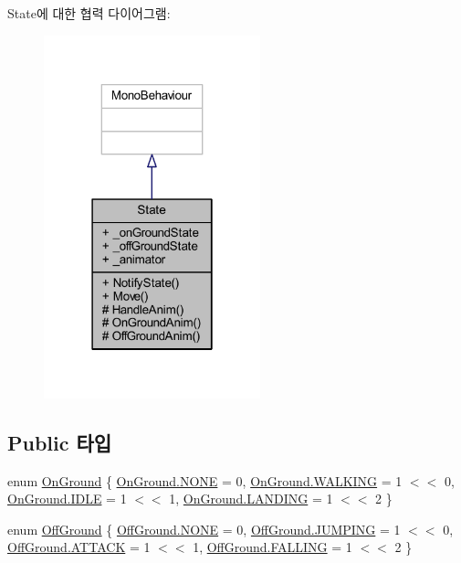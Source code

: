 State에 대한 협력 다이어그램\+:\nopagebreak
\begin{figure}[H]
\begin{center}
\leavevmode
\includegraphics[width=178pt]{dc/d8f/class_state__coll__graph}
\end{center}
\end{figure}
\subsection*{Public 타입}
\begin{DoxyCompactItemize}
\item 
enum \mbox{\hyperlink{class_state_ab9eb1c1d81f1903b8486d1275e78b68e}{On\+Ground}} \{ \mbox{\hyperlink{class_state_ab9eb1c1d81f1903b8486d1275e78b68eab50339a10e1de285ac99d4c3990b8693}{On\+Ground.\+N\+O\+NE}} = 0, 
\mbox{\hyperlink{class_state_ab9eb1c1d81f1903b8486d1275e78b68ea606c114184493a665cf1f6a12fbab9d3}{On\+Ground.\+W\+A\+L\+K\+I\+NG}} = 1 $<$$<$ 0, 
\mbox{\hyperlink{class_state_ab9eb1c1d81f1903b8486d1275e78b68eaa5daf7f2ebbba4975d61dab1c40188c7}{On\+Ground.\+I\+D\+LE}} = 1 $<$$<$ 1, 
\mbox{\hyperlink{class_state_ab9eb1c1d81f1903b8486d1275e78b68ea7ab0a1cfd85cc3da16cd3e3ad7448524}{On\+Ground.\+L\+A\+N\+D\+I\+NG}} = 1 $<$$<$ 2
 \}
\item 
enum \mbox{\hyperlink{class_state_a7d945e793324c017a973205564cf1a56}{Off\+Ground}} \{ \mbox{\hyperlink{class_state_a7d945e793324c017a973205564cf1a56ab50339a10e1de285ac99d4c3990b8693}{Off\+Ground.\+N\+O\+NE}} = 0, 
\mbox{\hyperlink{class_state_a7d945e793324c017a973205564cf1a56a6de49bfda8068b7bc3b0c0e3d2e43134}{Off\+Ground.\+J\+U\+M\+P\+I\+NG}} = 1 $<$$<$ 0, 
\mbox{\hyperlink{class_state_a7d945e793324c017a973205564cf1a56ac6ddd0f72ff2fd344693b9ca8d483871}{Off\+Ground.\+A\+T\+T\+A\+CK}} = 1 $<$$<$ 1, 
\mbox{\hyperlink{class_state_a7d945e793324c017a973205564cf1a56a4f9d4539ac1e11a251e2afe022eba4e6}{Off\+Ground.\+F\+A\+L\+L\+I\+NG}} = 1 $<$$<$ 2
 \}
\end{DoxyCompactItemize}
